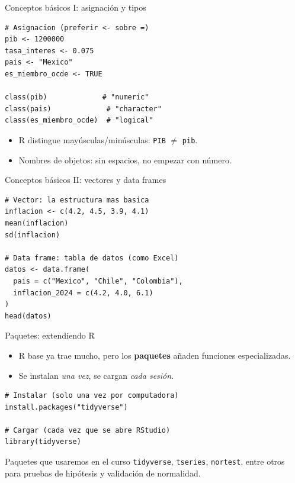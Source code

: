 \documentclass[aspectratio=169]{beamer}
\begin{document}
\begin{frame}[fragile]{Conceptos básicos I: asignación y tipos}
\begin{lstlisting}
# Asignacion (preferir <- sobre =)
pib <- 1200000
tasa_interes <- 0.075
pais <- "Mexico"
es_miembro_ocde <- TRUE

class(pib)             # "numeric"
class(pais)             # "character"
class(es_miembro_ocde)  # "logical"
\end{lstlisting}
\pause
\begin{itemize}
  \item R distingue mayúsculas/minúsculas: \texttt{PIB} $\neq$ \texttt{pib}.
  \item Nombres de objetos: sin espacios, no empezar con número.
\end{itemize}
\end{frame}

\begin{frame}[fragile]{Conceptos básicos II: vectores y data frames}
\begin{lstlisting}
# Vector: la estructura mas basica
inflacion <- c(4.2, 4.5, 3.9, 4.1)
mean(inflacion)
sd(inflacion)

# Data frame: tabla de datos (como Excel)
datos <- data.frame(
  pais = c("Mexico", "Chile", "Colombia"),
  inflacion_2024 = c(4.2, 4.0, 6.1)
)
head(datos)
\end{lstlisting}
\end{frame}

\begin{frame}[fragile]{Paquetes: extendiendo R}
\begin{itemize}
  \item<1-> R base ya trae mucho, pero los \textbf{paquetes} añaden funciones especializadas.
  \item<2-> Se instalan \textit{una vez}, se cargan \textit{cada sesión}.
\end{itemize}

\vspace{0.3cm}
\pause
\begin{lstlisting}
# Instalar (solo una vez por computadora)
install.packages("tidyverse")

# Cargar (cada vez que se abre RStudio)
library(tidyverse)
\end{lstlisting}

\pause
\begin{block}{Paquetes que usaremos en el curso}
\texttt{tidyverse}, \texttt{tseries}, \texttt{nortest}, entre otros para pruebas de hipótesis y validación de normalidad.
\end{block}
\end{frame}
\end{document}
